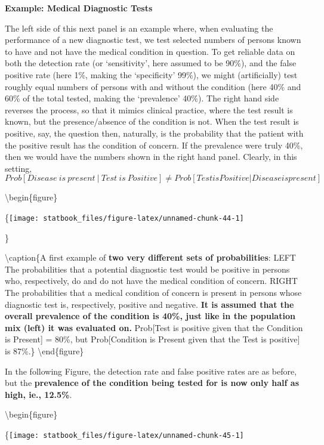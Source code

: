 \documentclass[]{book}
\begin{document}
\textbf{Example: Medical Diagnostic Tests}

The left side of this next panel is an example where, when evaluating the performance of a new diagnostic test, we test selected numbers of persons known to have and not have the medical condition in question. To get reliable data on both the detection rate (or `sensitivity', here assumed to be 90\%), and the false positive rate (here 1\%, making the `specificity' 99\%), we might (artificially) test roughly equal numbers of persons with and without the condition (here 40\% and 60\% of the total tested, making the `prevalence' 40\%). The right hand side reverses the process, so that it mimics clinical practice, where the test result is known, but the presence/absence of the condition is not. When the test result is positive, say, the question then, naturally, is the probability that the patient with the positive result has the condition of concern. If the prevalence were truly 40\%, then we would have the numbers shown in the right hand panel. Clearly, in this setting,
\[Prob[Disease \ is \ present \ | \ Test \ is \ Positive] \ne Prob[Test is Positive | Disease is present]\]

\textbackslash{}begin\{figure\}

\{\centering \texttt{[image: statbook\_files/figure-latex/unnamed-chunk-44-1]}

\}

\textbackslash{}caption\{A first example of \textbf{two very different sets of probabilities}: LEFT The probabilities that a potential diagnostic test would be positive in persons who, respectively, do and do not have the medical condition of concern. RIGHT The probabilities that a medical condition of concern is present in persons whose diagnostic test is, respectively, positive and negative. \textbf{It is assumed that the overall prevalence of the condition is 40\%, just like in the population mix (left) it was evaluated on.} Prob{[}Test is positive given that the Condition is Present{]} = 80\%, but Prob{[}Condition is Present given that the Test is positive{]} is 87\%.\}\label{fig:unnamed-chunk-44}
\textbackslash{}end\{figure\}

In the following Figure, the detection rate and false positive rates are as before, but the \textbf{prevalence of the condition being tested for is now only half as high, ie., 12.5\%}.

\textbackslash{}begin\{figure\}

\{\centering \texttt{[image: statbook\_files/figure-latex/unnamed-chunk-45-1]}
\end{document}
